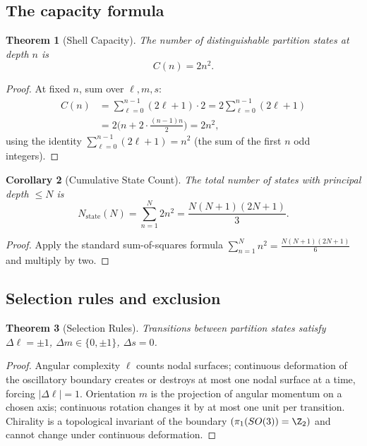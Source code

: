 \documentclass[twocolumn,10pt,a4paper]{article}
\theoremstyle{thmstyle}
\newtheorem{theorem}{Theorem}[section]
\newtheorem{corollary}[theorem]{Corollary}
\theoremstyle{definition}
\theoremstyle{remark}
\newcommand{\Nstate}{N_{\mathrm{state}}}
\begin{document}
\subsection{The capacity formula}

\begin{theorem}[Shell Capacity]
\label{thm:cap}
The number of distinguishable partition states at depth $n$ is
\begin{equation}
C(n)=2n^{2}.
\end{equation}
\end{theorem}

\begin{proof}
At fixed $n$, sum over $\ell,m,s$:
\begin{align*}
C(n)&=\sum_{\ell=0}^{n-1}(2\ell+1)\cdot 2
=2\sum_{\ell=0}^{n-1}(2\ell+1)\\
&=2\bigl(n+2\cdot\tfrac{(n-1)n}{2}\bigr)=2n^{2},
\end{align*}
using the identity $\sum_{\ell=0}^{n-1}(2\ell+1)=n^{2}$ (the sum of
the first $n$ odd integers).
\end{proof}

\begin{corollary}[Cumulative State Count]
\label{cor:cum}
The total number of states with principal depth $\leq N$ is
\begin{equation}
\Nstate(N)=\sum_{n=1}^{N}2n^{2}=\frac{N(N+1)(2N+1)}{3}.
\label{eq:Nstate}
\end{equation}
\end{corollary}

\begin{proof}
Apply the standard sum-of-squares formula
$\sum_{n=1}^{N}n^{2}=\tfrac{N(N+1)(2N+1)}{6}$ and multiply by two.
\end{proof}

\subsection{Selection rules and exclusion}

\begin{theorem}[Selection Rules]
\label{thm:select}
Transitions between partition states satisfy
$\Delta\ell=\pm 1$, $\Delta m\in\{0,\pm 1\}$, $\Delta s=0$.
\end{theorem}

\begin{proof}
Angular complexity $\ell$ counts nodal surfaces; continuous
deformation of the oscillatory boundary creates or destroys at most
one nodal surface at a time, forcing $|\Delta\ell|=1$.
Orientation $m$ is the projection of angular momentum on a chosen
axis; continuous rotation changes it by at most one unit per
transition. Chirality is a topological invariant of the boundary
$(\pi_{1}(SO(3))=\Z_{2})$ and cannot change under continuous
deformation.
\end{proof}
\end{document}
